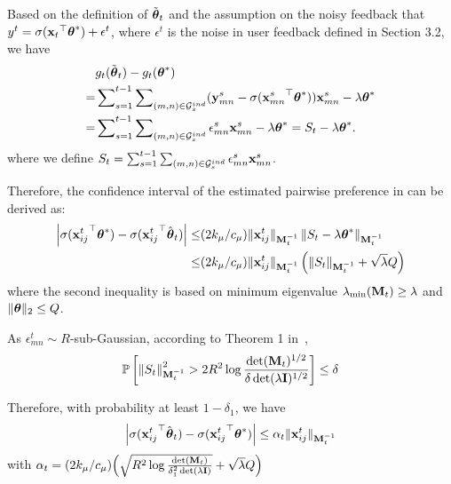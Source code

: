 Based on the definition of $\tilde {\boldsymbol{\theta}}_t$ and the assumption on the noisy feedback that $y^t = \sigma({\mathbf{x}_t}^\top\boldsymbol{\theta}^*) + \epsilon^t$, where $\epsilon^t$ is the noise in user feedback defined in Section 3.2, we have 
\small
\begin{align*}
    &g_t(\tilde{\boldsymbol{\theta}}_t) - g_t(\boldsymbol{\theta}^*) \\
    =& \sum\nolimits_{s=1}^{t-1}\sum\nolimits_{(m, n)\in\mathcal{G}_{s}^{ind}}({\mathbf{y}_{mn}^s} -  \sigma({{\mathbf{x}_{mn}^s}}^\top\boldsymbol{\theta}^*)) {\mathbf{x}_{mn}^s} - \lambda\boldsymbol{\theta}^* \\
    =& \sum\nolimits_{s=1}^{t-1}\sum\nolimits_{(m, n)\in \mathcal{G}_s^{ind}} \epsilon_{mn}^s{\mathbf{x}_{mn}^s} - \lambda\boldsymbol{\theta}^* = S_t - \lambda\boldsymbol{\theta}^*.
\end{align*}
\normalsize
where we define $S_t = \sum_{s=1}^{t-1}\sum_{(m, n)\in\mathcal{G}_{s}^{ind}}\epsilon^s_{mn}{\mathbf{x}_{mn}^s}$.

Therefore, the confidence interval of the estimated pairwise preference in \model{} can be derived as:
\small
\begin{align*}
    \left|\sigma({\mathbf{x}_{ij}^t}^\top\boldsymbol{\theta}^*) - \sigma({\mathbf{x}_{ij}^t}^\top\hat{\boldsymbol{\theta}}_t) \right| \leq & ({2k_{\mu}}/{c_{\mu}}) \Vert{\mathbf{x}_{ij}^t}\Vert_{\mathbf{M}_t^{-1}}\left\| S_t - \lambda\boldsymbol{\theta}^*\right\|_{\mathbf{M}_{t}^{-1}} \\
    \leq & ({2k_{\mu}}/{c_{\mu}}) \Vert{\mathbf{x}_{ij}^t}\Vert_{\mathbf{M}_t^{-1}}\left(\left\| S_t\right\|_{\mathbf{M}_t^{-1}} + \sqrt{\lambda}Q\right)
\end{align*}
\normalsize
where the second inequality is based on minimum eigenvalue $\lambda_{\min}(\mathbf{M}_t) \geq \lambda$ and $\Vert\boldsymbol{\theta}\Vert_2 \leq Q$.

As $\epsilon_{mn}^t \sim R$-sub-Gaussian, according to Theorem 1 in~\cite{abbasi2011improved},
\small
\begin{equation*}
    \mathbb{P}\left[ \left\| S_t\right\|_{\mathbf{M}_t^{-1}}^2 > 2R^2\log{\frac{\det(\mathbf{M}_t)^{1/2}}{\delta \det(\lambda\mathbf{I})^{1/2}}}\right] \leq \delta
\end{equation*}
\normalsize

Therefore, with probability at least $1 - \delta_1$, we have
\begin{equation*}
    \left|\sigma({{\mathbf{x}_{ij}^t}}^\top \hat{\boldsymbol{\theta}}_t) - \sigma({{\mathbf{x}_{ij}^t}}^\top \boldsymbol{\theta}^*) \right| \leq \alpha_t\Vert{\mathbf{x}_{ij}^t}\Vert_{\mathbf{M}_t^{-1}}
\end{equation*}
with $\alpha_t = ({2k_{\mu}}/{c_{\mu}}) \Big(\sqrt{R^2\log{\frac{\det(\mathbf{M}_t)}{\delta_1^2 \det(\lambda \mathbf{I})}}} + \sqrt{\lambda} Q\Big)$

